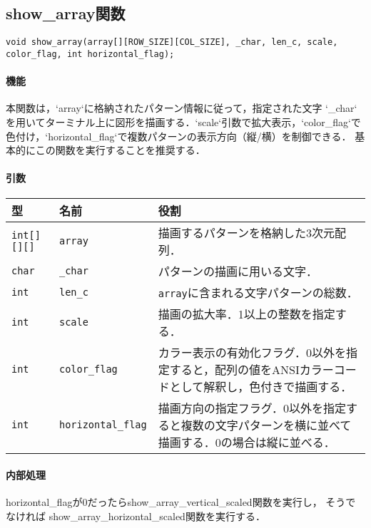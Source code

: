 \documentclass[uplatex]{jsarticle}
\begin{document}
\subsection{show\_array関数}
\texttt{void show\_array(array[][ROW\_SIZE][COL\_SIZE], \_char, len\_c, scale, color\_flag, int horizontal\_flag);}
\paragraph{機能}
本関数は，`array`に格納されたパターン情報に従って，指定された文字 `\_char` を用いてターミナル上に図形を描画する．`scale`引数で拡大表示，`color\_flag`で色付け，`horizontal\_flag`で複数パターンの表示方向（縦/横）を制御できる．
基本的にこの関数を実行することを推奨する．

\paragraph{引数}
\begin{center}
    \begin{tabular}{|l|l|p{7.5cm}|}
        \hline
        \textbf{型} & \textbf{名前} & \textbf{役割} \\ \hline
        \texttt{int[][][]} & \texttt{array} & 描画するパターンを格納した3次元配列． \\ \hline
        \texttt{char} & \texttt{\_char} & パターンの描画に用いる文字． \\ \hline
        \texttt{int} & \texttt{len\_c} & \texttt{array}に含まれる文字パターンの総数． \\ \hline
        \texttt{int} & \texttt{scale} & 描画の拡大率．1以上の整数を指定する． \\ \hline
        \texttt{int} & \texttt{color\_flag} & カラー表示の有効化フラグ．0以外を指定すると，配列の値をANSIカラーコードとして解釈し，色付きで描画する． \\ \hline
        \texttt{int} & \texttt{horizontal\_flag} & 描画方向の指定フラグ．0以外を指定すると複数の文字パターンを横に並べて描画する．0の場合は縦に並べる． \\ \hline
    \end{tabular}
\end{center}

\paragraph{内部処理}
horizontal\_flagが0だったらshow\_array\_vertical\_scaled関数を実行し，
そうでなければ
show\_array\_horizontal\_scaled関数を実行する．
\end{document}
